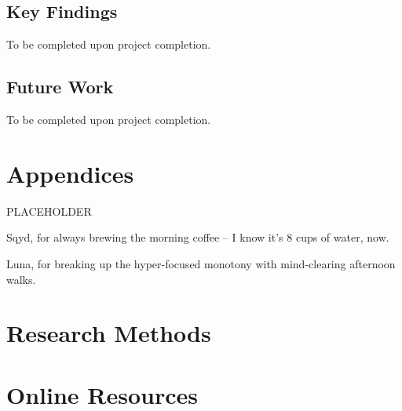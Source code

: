 \documentclass[sigconf]{acmart}
\begin{document}
\subsection{Key Findings}
To be completed upon project completion.
\subsection{Future Work}
To be completed upon project completion.

\section{Appendices}
PLACEHOLDER


\begin{acks}
 \hspace{3mm} Sqyd, for always brewing the morning coffee -- I know it's 8 cups of water, now.

Luna, for breaking up the hyper-focused monotony with mind-clearing afternoon walks.
\end{acks}





\appendix

\section{Research Methods}

\section{Online Resources}
\end{document}
